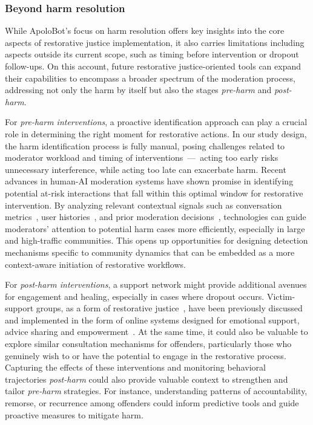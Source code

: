 \subsubsection{Beyond harm resolution}
While ApoloBot's focus on harm resolution offers key insights into the core aspects of restorative justice implementation, it also carries limitations including aspects outside its current scope, such as timing before intervention or dropout follow-ups. On this account, future restorative justice-oriented tools can expand their capabilities to encompass a broader spectrum of the moderation process, addressing not only the harm by itself but also the stages \textit{pre-harm} and \textit{post-harm}.

For \textit{pre-harm interventions}, a proactive identification approach can play a crucial role in determining the right moment for restorative actions. In our study design, the harm identification process is fully manual, posing challenges related to moderator workload and timing of interventions~---~acting too early risks unnecessary interference, while acting too late can exacerbate harm. Recent advances in human-AI moderation systems have shown promise in identifying potential at-risk interactions that fall within this optimal window for restorative intervention. By analyzing relevant contextual signals such as conversation metrics~\cite{Choi2023, Schluger2022}, user histories~\cite{Im2020}, and prior moderation decisions~\cite{Chandrasekharan2019}, technologies can guide moderators’ attention to potential harm cases more efficiently, especially in large and high-traffic communities. This opens up opportunities for designing detection mechanisms specific to community dynamics that can be embedded as a more context-aware initiation of restorative workflows. 

For \textit{post-harm interventions}, a support network might provide additional avenues for engagement and healing, especially in cases where dropout occurs. Victim-support groups, as a form of restorative justice~\cite{Dignan2004}, have been previously discussed and implemented in the form of online systems designed for emotional support, advice sharing and empowerment~\cite{Dimond2013, Blackwell2017}. At the same time, it could also be valuable to explore similar consultation mechanisms for offenders, particularly those who genuinely wish to or have the potential to engage in the restorative process. Capturing the effects of these interventions and monitoring behavioral trajectories \textit{post-harm} could also provide valuable context to strengthen and tailor \textit{pre-harm} strategies. For instance, understanding patterns of accountability, remorse, or recurrence among offenders could inform predictive tools and guide proactive measures to mitigate harm.

